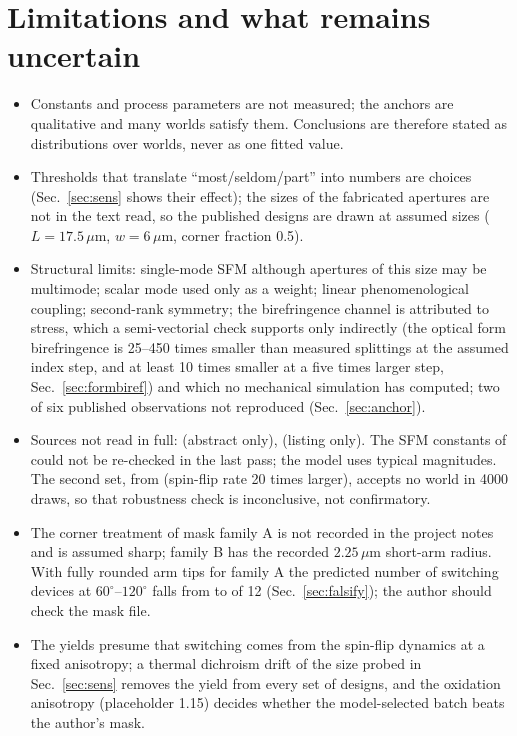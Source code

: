 \documentclass[10pt]{article}
\begin{document}
\section{Limitations and what remains uncertain}
\begin{itemize}\setlength\itemsep{1pt}
\item Constants and process parameters are not measured; the anchors are qualitative and many worlds satisfy them. Conclusions are therefore stated as distributions over worlds, never as one fitted value.
\item Thresholds that translate ``most/seldom/part'' into numbers are choices (Sec.~\ref{sec:sens} shows their effect); the sizes of the fabricated apertures are not in the text read, so the published designs are drawn at assumed sizes ($L=17.5\,\mu$m, $w=6\,\mu$m, corner fraction 0.5).
\item Structural limits: single-mode SFM although apertures of this size may be multimode; scalar mode used only as a weight; linear phenomenological coupling; second-rank symmetry; the birefringence channel is attributed to stress, which a semi-vectorial check supports only indirectly (the optical form birefringence is 25--450 times smaller than measured splittings at the assumed index step, and at least 10 times smaller at a five times larger step, Sec.~\ref{sec:formbiref}) and which no mechanical simulation has computed; two of six published observations not reproduced (Sec.~\ref{sec:anchor}).
\item Sources not read in full: \cite{yuan2025jlt} (abstract only), \cite{yuan2025apl127} (listing only). The SFM constants of \cite{yuan2025apl126} could not be re-checked in the last pass; the model uses typical magnitudes. The second set, from \cite{chen2026meta} (spin-flip rate 20 times larger), accepts no world in 4000 draws, so that robustness check is inconclusive, not confirmatory.
\item The corner treatment of mask family A is not recorded in the project notes and is assumed sharp; family B has the recorded $2.25\,\mu$m short-arm radius. With fully rounded arm tips for family A the predicted number of switching devices at $60^\circ$--$120^\circ$ falls from \cntHighMean{} to \cntHighRoundMean{} of 12 (Sec.~\ref{sec:falsify}); the author should check the mask file.
\item The yields presume that switching comes from the spin-flip dynamics at a fixed anisotropy; a thermal dichroism drift of the size probed in Sec.~\ref{sec:sens} removes the yield from every set of designs, and the oxidation anisotropy (placeholder 1.15) decides whether the model-selected batch beats the author's mask.

\end{itemize}
\end{document}
